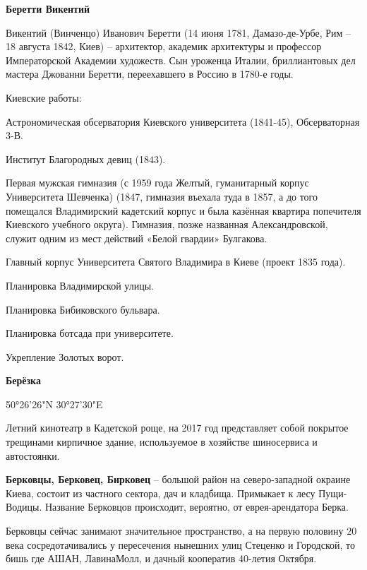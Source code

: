 \medskip


\textbf{Беретти Викентий}

Викентий (Винченцо) Иванович Беретти (14 июня 1781, Дамазо-де-Урбе, Рим – 18 августа 1842, Киев) – архитектор, академик архитектуры и профессор Императорской Академии художеств. Сын уроженца Италии, бриллиантовых дел мастера Джованни Беретти, переехавшего в Россию в 1780-е годы.

Киевские работы:

Астрономическая обсерватория Киевского университета (1841-45), Обсерваторная 3-В. 

Институт Благородных девиц  (1843).

Первая мужская гимназия (с 1959 года Желтый, гуманитарный корпус Университета Шевченка) (1847, гимназия въехала туда в 1857, а до того помещался Владимирский кадетский корпус и была казённая квартира попечителя Киевского учебного округа). Гимназия, позже названная Александровской, служит одним из мест действий «Белой гвардии» Булгакова.

Главный корпус Университета Святого Владимира в Киеве (проект 1835 года).

Планировка Владимирской улицы. 

Планировка Бибиковского бульвара.

Планировка ботсада при университете.


Укрепление Золотых ворот.\\


\medskip



\textbf{Берёзка} 

50°26'26"N 30°27'30"E

Летний кинотеатр в Кадетской роще, на 2017 год представляет собой покрытое трещинами кирпичное здание, используемое в хозяйстве шиносервиса и автостоянки.\\

\medskip


\textbf{Берковцы, Берковец, Бирковец} – большой район на северо-западной окраине Киева, состоит из частного сектора, дач и кладбища. Примыкает к лесу Пущи-Водицы. Название Берковцов происходит, вероятно, от еврея-арендатора Берка.

Берковцы сейчас занимают значительное пространство, а на первую половину 20 века сосредотачивались у пересечения нынешних улиц Стеценко и Городской, то бишь где АШАН, ЛавинаМолл, и дачный кооператив 40-летия Октября. 

